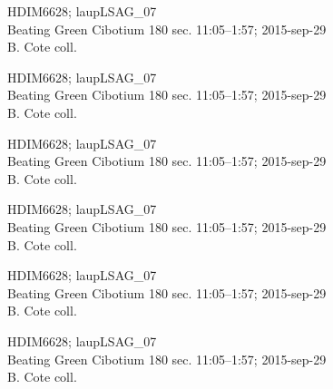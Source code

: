 \documentclass[2pt]{extarticle}
\begin{document}
\noindent
\parbox{0.16\textwidth}{\tiny \raggedright \rule[-0.3\baselineskip]{0pt}{10pt}HDIM6628; laupLSAG\_07\\ Beating Green Cibotium 180 sec. 11:05--1:57; 2015-sep-29\\ B. Cote coll.}
\parbox{0.16\textwidth}{\tiny \raggedright \rule[-0.3\baselineskip]{0pt}{10pt}HDIM6628; laupLSAG\_07\\ Beating Green Cibotium 180 sec. 11:05--1:57; 2015-sep-29\\ B. Cote coll.}
\parbox{0.16\textwidth}{\tiny \raggedright \rule[-0.3\baselineskip]{0pt}{10pt}HDIM6628; laupLSAG\_07\\ Beating Green Cibotium 180 sec. 11:05--1:57; 2015-sep-29\\ B. Cote coll.}
\parbox{0.16\textwidth}{\tiny \raggedright \rule[-0.3\baselineskip]{0pt}{10pt}HDIM6628; laupLSAG\_07\\ Beating Green Cibotium 180 sec. 11:05--1:57; 2015-sep-29\\ B. Cote coll.}
\parbox{0.16\textwidth}{\tiny \raggedright \rule[-0.3\baselineskip]{0pt}{10pt}HDIM6628; laupLSAG\_07\\ Beating Green Cibotium 180 sec. 11:05--1:57; 2015-sep-29\\ B. Cote coll.}
\parbox{0.16\textwidth}{\tiny \raggedright \rule[-0.3\baselineskip]{0pt}{10pt}HDIM6628; laupLSAG\_07\\ Beating Green Cibotium 180 sec. 11:05--1:57; 2015-sep-29\\ B. Cote coll.} \\ 
\vspace{0.001in} 
\end{document}

